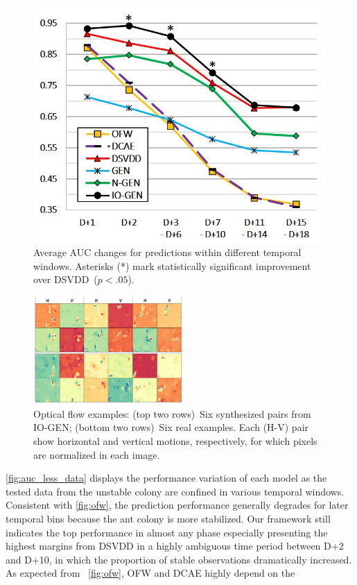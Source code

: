 \documentclass[letterpaper]{article} %
\let\orgautoref\autoref
\providecommand{\Autoref}
{\def\equationautorefname{Equation}%
\def\figureautorefname{Figure}%
\def\subfigureautorefname{Figure}%
\def\Itemautorefname{Item}%
\def\tableautorefname{Table}%
\def\exerciseautorefname{Exercise}%
\def\starexerciseautorefname{Exercise}%
\def\sectionautorefname{Section}%
\def\subsectionautorefname{Section}%
\def\subsubsectionautorefname{Section}%
\def\chapterautorefname{Section}%
\def\partautorefname{Part}%
\orgautoref}
\renewcommand{\autoref}
{\def\equationautorefname{Equation}%
\def\figureautorefname{Fig.}%
\def\subfigureautorefname{Fig.}%
\def\Itemautorefname{item}%
\def\tableautorefname{Table}%
\def\exerciseautorefname{Exercise}%
\def\starexerciseautorefname{Exercise}%
\def\sectionautorefname{Section}%
\def\subsectionautorefname{Section}%
\def\subsubsectionautorefname{Section}%
\def\chapterautorefname{Section}%
\def\partautorefname{Part}%
\orgautoref}
\begin{document}
\begin{figure}[t]
\centering
\includegraphics[width=.75\columnwidth]{auc_less_data}
\caption{
Average AUC changes for predictions within different temporal
windows.
Asterisks (*) mark statistically significant improvement over
DSVDD~($p<.05$).
}
\label{fig:auc_less_data}
\end{figure}
\begin{figure}\centering
\includegraphics[width=.75\linewidth,height=1.62in ]{real_fake_flows}
\caption{Optical flow examples:
(top two rows)~Six synthesized pairs from \mbox{IO-GEN};
(bottom two rows)~Six real examples.
Each (H-V) pair show horizontal and vertical motions,
respectively, for which pixels are normalized in each image.
}
\label{fig:real_fake_flows}
\end{figure}
\Autoref{fig:auc_less_data} displays the performance variation of each
model as the tested data from the unstable colony are confined in
various temporal windows.
Consistent with \autoref{fig:ofw}, the prediction performance
generally degrades for later temporal bins because the ant colony is
more stabilized. Our framework still indicates the top performance in
almost any phase especially presenting the highest margins from DSVDD
in a highly ambiguous time period between D+2 and D+10, in which the
proportion of stable observations dramatically increased.
As expected from~\autoref{fig:ofw}, OFW and DCAE highly depend on the
\end{document}
